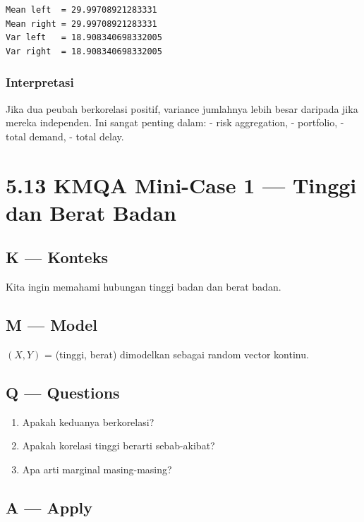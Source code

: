 \documentclass[
  letterpaper,
  DIV=11,
  numbers=noendperiod]{scrreprt}
\providecommand{\tightlist}{%
  \setlength{\itemsep}{0pt}\setlength{\parskip}{0pt}}
\begin{document}
\begin{verbatim}
Mean left  = 29.99708921283331
Mean right = 29.99708921283331
Var left   = 18.908340698332005
Var right  = 18.908340698332005
\end{verbatim}

\subsubsection{Interpretasi}\label{interpretasi-22}

Jika dua peubah berkorelasi positif, variance jumlahnya lebih besar
daripada jika mereka independen. Ini sangat penting dalam: - risk
aggregation, - portfolio, - total demand, - total delay.

\section{5.13 KMQA Mini-Case 1 --- Tinggi dan Berat
Badan}\label{kmqa-mini-case-1-tinggi-dan-berat-badan}

\subsection{K --- Konteks}\label{k-konteks-40}

Kita ingin memahami hubungan tinggi badan dan berat badan.

\subsection{M --- Model}\label{m-model-40}

\((X,Y)\) = (tinggi, berat) dimodelkan sebagai random vector kontinu.

\subsection{Q --- Questions}\label{q-questions-40}

\begin{enumerate}
\def\labelenumi{\arabic{enumi}.}
\tightlist
\item
  Apakah keduanya berkorelasi?
\item
  Apakah korelasi tinggi berarti sebab-akibat?
\item
  Apa arti marginal masing-masing?
\end{enumerate}

\subsection{A --- Apply}\label{a-apply-39}
\end{document}
